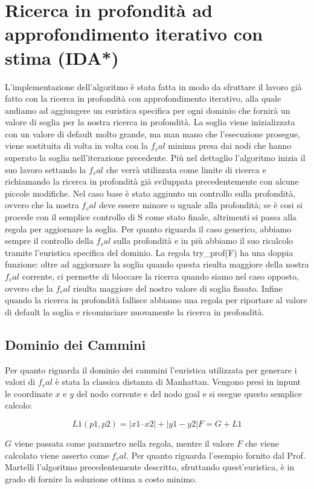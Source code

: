 \section{Ricerca in profondità ad approfondimento iterativo con stima (IDA*)}
L'implementazione dell'algoritmo è stata fatta in modo da sfruttare il lavoro già fatto con la ricerca in profondità con approfondimento iterativo, alla quale andiamo ad aggiungere un euristica specifica per ogni dominio che fornirà un valore di soglia per la nostra ricerca in profondità.
La soglia viene inizializzata con un valore di default molto grande, ma man mano che l'esecuzione prosegue, viene sostituita di volta in volta con la $f_val$ minima presa dai nodi che hanno superato la soglia nell'iterazione precedente. Più nel dettaglio l'algoritmo inizia il suo lavoro settando la $f_val$ che verrà utilizzata come limite di ricerca e richiamando la ricerca in profondità già sviluppata precedentemente con alcune piccole modifiche. Nel caso base è stato aggiunto un controllo sulla profondità, ovvero che la nostra $f_val$ deve essere minore o uguale alla profondità; se è cosi si procede con il semplice controllo di S come stato finale, altrimenti si passa alla regola per aggiornare la soglia. Per quanto riguarda il caso generico, abbiamo sempre il controllo della $f_val$ sulla profondità e in più abbiamo il suo ricalcolo tramite l'euristica specifica del dominio. La regola try_prof(F) ha una doppia funzione: oltre ad aggiornare la soglia quando questa risulta maggiore della nostra $f_val$ corrente, ci permette di bloccare la ricerca quando siamo nel caso opposto, ovvero che la $f_val$ risulta maggiore del nostro valore di soglia fissato. Infine quando la ricerca in profondità fallisce abbiamo una regola per riportare al valore di default la soglia e ricominciare nuovamente la ricerca in profondità.

\subsection{Dominio dei Cammini}
Per quanto riguarda il dominio dei cammini l'euristica utilizzata per generare i valori di $f_val$ è stata la classica distanza di Manhattan. Vengono presi in inpunt le coordinate $x$ e $y$ del nodo corrente e del nodo goal e si esegue questo semplice calcolo:

$$L1(p1,p2) = |x1 – x2| + |y1 - y2|
F = G + L1$$

$G$ viene passata come parametro nella regola, mentre il valore $F$ che viene calcolato viene asserto come $f_val$. Per quanto riguarda l'esempio fornito dal Prof. Martelli l'algoritmo precedentemente descritto, sfruttando quest'euristica, è in grado di fornire la soluzione ottima a costo minimo.

